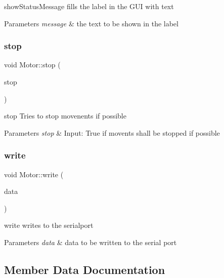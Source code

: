 show\+Status\+Message fills the label in the G\+UI with text 


\begin{DoxyParams}{Parameters}
{\em message} & the text to be shown in the label \\
\hline
\end{DoxyParams}
\mbox{\label{classMotor_a9ca6508221ea2c42a5220848ab37df30}} 
\subsubsection{\texorpdfstring{stop}{stop}}
{\footnotesize\ttfamily void Motor\+::stop (\begin{DoxyParamCaption}\item[{bool}]{stop }\end{DoxyParamCaption})\hspace{0.3cm}{\ttfamily [slot]}}



stop Tries to stop movenents if possible 


\begin{DoxyParams}{Parameters}
{\em stop} & Input\+: True if movents shall be stopped if possible \\
\hline
\end{DoxyParams}
\mbox{\label{classMotor_a8305ead4b01433cb8a01eb5440a8b570}} 
\subsubsection{\texorpdfstring{write}{write}}
{\footnotesize\ttfamily void Motor\+::write (\begin{DoxyParamCaption}\item[{const Q\+Byte\+Array \&}]{data }\end{DoxyParamCaption})\hspace{0.3cm}{\ttfamily [slot]}}



write writes to the serialport 


\begin{DoxyParams}{Parameters}
{\em data} & data to be written to the serial port \\
\hline
\end{DoxyParams}


\subsection{Member Data Documentation}
\mbox{\label{classMotor_adbb59f89d592f1569ba8ad05c5c58a73}} 
